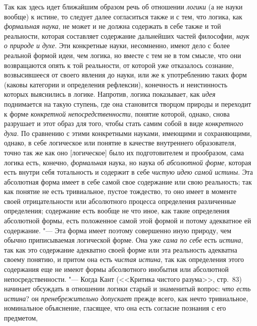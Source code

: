 Так как здесь идет ближайшим образом речь об отношении
{\em логики} (а не науки
вообще) к истине, то следует далее согласиться также и с тем, что логика,
как {\em формальная наука},
не может и не должна содержать в себе также и той реальности,
которая составляет содержание дальнейших частей философии,
{\em наук о природе и духе}.
Эти конкретные науки, несомненно, имеют дело с более реальной
формой идеи, чем логика, но вместе с тем не в том смысле, что они
возвращаются опять к той реальности, от которой уже отказалось сознание,
возвысившееся от своего явления до науки, или же к употреблению таких форм
(каковы категории и определения рефлексии), конечность и неистинность
которых выяснились в логике. Напротив, логика показывает, как
{\em идея} поднимается на
такую ступень, где она становится творцом природы и переходит к форме
{\em конкретной непосредственности},
понятие которой, однако, снова разрушает и этот образ для
того, чтобы стать самим собой в виде
{\em конкретного духа}.
По сравнению с этими конкретными науками, имеющими и
сохраняющими, однако, в себе логическое или понятие в качестве внутреннего
образователя, точно так же как оно [логическое] было их подготовителем и
прообразом, сама логика есть, конечно,
{\em формальная} наука,
но наука об {\em абсолютной форме},
которая есть внутри себя тотальность и содержит в себе
{\em чистую идею самой истины}.
Эта абсолютная форма имеет в себе самой свое содержание или
свою реальность; так как понятие не есть тривиальное, пустое тождество, то
оно имеет в моменте своей отрицательности или абсолютного процесса
определения различенные определения; содержание есть вообще не что иное,
как такие определения абсолютной формы, есть положенное самой этой формой и
потому адекватное ей содержание. "--- Эта форма имеет поэтому
совершенно иную природу, чем обычно приписываемая логической
форме. Она уже {\em сама по себе}
есть {\em истина},
так как это содержание адекватно своей форме или эта
реальность адекватна своему понятию, и притом она есть
{\em чистая истина}, так
как определения этого содержания еще не имеют формы абсолютного инобытия
или абсолютной непосредственности. "--- Когда Кант (<<Критика
чистого разума>>, стр.~83) начинает обсуждать в отношении логики старый и
знаменитый вопрос: {\em что есть
истина}? он
{\em пренебрежительно допускает
}прежде всего, как нечто тривиальное, номинальное
объяснение, гласящее, что она есть согласие познания с его
предметом,

